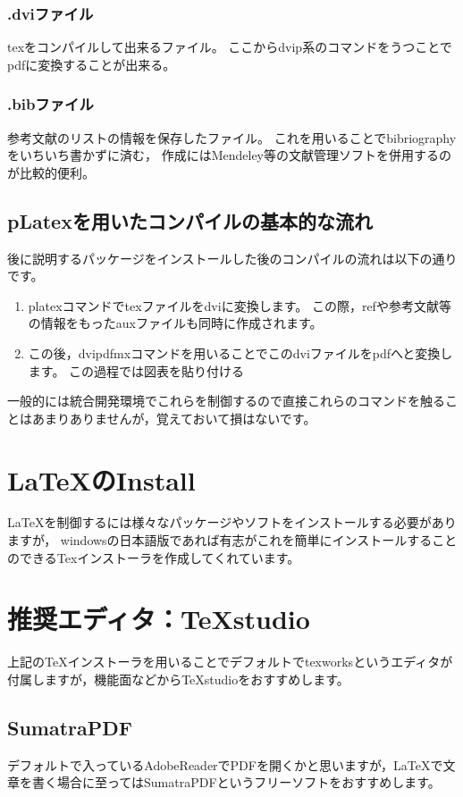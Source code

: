 \documentclass[a4paper,10pt,twocolumn,fleqn]{jarticle}
\begin{document}
\subsubsection*{.dviファイル}
texをコンパイルして出来るファイル。
ここからdvip系のコマンドをうつことでpdfに変換することが出来る。
\subsubsection*{.bibファイル}
参考文献のリストの情報を保存したファイル。
これを用いることでbibriographyをいちいち書かずに済む，
作成にはMendeley等の文献管理ソフトを併用するのが比較的便利。

\subsection{pLatexを用いたコンパイルの基本的な流れ}
後に説明するパッケージをインストールした後のコンパイルの流れは以下の通りです。
\begin{enumerate}
\item platexコマンドでtexファイルをdviに変換します。
この際，refや参考文献等の情報をもったauxファイルも同時に作成されます。

\item この後，dvipdfmxコマンドを用いることでこのdviファイルをpdfへと変換します。
この過程では図表を貼り付ける
\end{enumerate}
一般的には統合開発環境でこれらを制御するので直接これらのコマンドを触ることはあまりありませんが，覚えておいて損はないです。

\section{\LaTeX のInstall}
LaTeXを制御するには様々なパッケージやソフトをインストールする必要がありますが，
windowsの日本語版であれば有志がこれを簡単にインストールすることのできるTexインストーラを作成してくれています。

\section{推奨エディタ：TeXstudio}
上記のTeXインストーラを用いることでデフォルトでtexworksというエディタが付属しますが，機能面などからTeXstudioをおすすめします。

\subsection{SumatraPDF}
デフォルトで入っているAdobeReaderでPDFを開くかと思いますが，LaTeXで文章を書く場合に至ってはSumatraPDFというフリーソフトをおすすめします。
\end{document}
